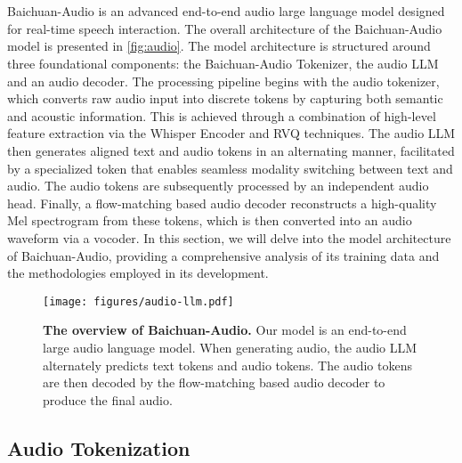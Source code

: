 \section{\ours}
%
Baichuan-Audio is an advanced end-to-end audio large language model designed for real-time speech interaction. The overall architecture of the Baichuan-Audio model is presented in \autoref{fig:audio}. The model architecture is structured around three foundational components: the Baichuan-Audio Tokenizer, the audio LLM and an audio decoder. The processing pipeline begins with the audio tokenizer, which converts raw audio input into discrete tokens by capturing both semantic and acoustic information. This is achieved through a combination of high-level feature extraction via the Whisper Encoder and RVQ techniques. The audio LLM then generates aligned text and audio tokens in an alternating manner, facilitated by a specialized token that enables seamless modality switching between text and audio. The audio tokens are subsequently processed by an independent audio head. Finally, a flow-matching based audio decoder reconstructs a high-quality Mel spectrogram from these tokens, which is then converted into an audio waveform via a vocoder. In this section, we will delve into the model architecture of Baichuan-Audio, providing a comprehensive analysis of its training data and the methodologies employed in its development.

\begin{figure*}[t]
  \centering
  \texttt{[image: figures/audio-llm.pdf]}
  \caption{\textbf{The overview of Baichuan-Audio.} Our model is an end-to-end large audio  language model. When generating audio, the audio LLM alternately predicts text tokens and audio tokens. The audio tokens are then decoded by the flow-matching based audio decoder to produce the final audio.}
  \label{fig:audio}
\end{figure*}

\subsection{Audio Tokenization}


